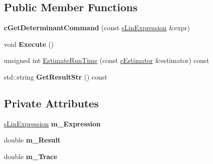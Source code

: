 \subsection*{Public Member Functions}
\begin{DoxyCompactItemize}
\item 
\hypertarget{classengine_1_1cGetDeterminantCommand_af41928fb91662c6472a520e6c6d98744}{{\bfseries c\-Get\-Determinant\-Command} (const \hyperlink{structengine_1_1sLinExpression}{s\-Lin\-Expression} \&expr)}\label{classengine_1_1cGetDeterminantCommand_af41928fb91662c6472a520e6c6d98744}

\item 
\hypertarget{classengine_1_1cGetDeterminantCommand_aca480db2b0ba85de5fbc51a9b85c8fc1}{void {\bfseries Execute} ()}\label{classengine_1_1cGetDeterminantCommand_aca480db2b0ba85de5fbc51a9b85c8fc1}

\item 
unsigned int \hyperlink{classengine_1_1cGetDeterminantCommand_acd191b8e162f5d2396d1b61973b8fd69}{Estimate\-Run\-Time} (const \hyperlink{classengine_1_1cEstimator}{c\-Estimator} \&estimator) const 
\item 
\hypertarget{classengine_1_1cGetDeterminantCommand_a0059ad9c7f886f0d8387e0362c96e6b5}{std\-::string {\bfseries Get\-Result\-Str} () const }\label{classengine_1_1cGetDeterminantCommand_a0059ad9c7f886f0d8387e0362c96e6b5}

\end{DoxyCompactItemize}
\subsection*{Private Attributes}
\begin{DoxyCompactItemize}
\item 
\hypertarget{classengine_1_1cGetDeterminantCommand_affdad2125e2d03bc67000198de393e91}{\hyperlink{structengine_1_1sLinExpression}{s\-Lin\-Expression} {\bfseries m\-\_\-\-Expression}}\label{classengine_1_1cGetDeterminantCommand_affdad2125e2d03bc67000198de393e91}

\item 
\hypertarget{classengine_1_1cGetDeterminantCommand_ad4bfdf460c6ce545c427a9c231f5ed93}{double {\bfseries m\-\_\-\-Result}}\label{classengine_1_1cGetDeterminantCommand_ad4bfdf460c6ce545c427a9c231f5ed93}

\item 
\hypertarget{classengine_1_1cGetDeterminantCommand_abd03bf402620e2d851fb746aacd6a44b}{double {\bfseries m\-\_\-\-Trace}}\label{classengine_1_1cGetDeterminantCommand_abd03bf402620e2d851fb746aacd6a44b}

\end{DoxyCompactItemize}


